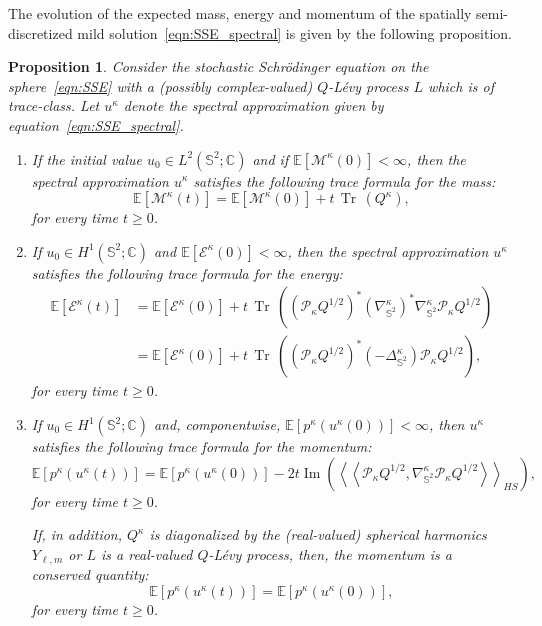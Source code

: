 \documentclass[11pt]{amsart}
\newtheorem{proposition}[theorem]{Proposition}
\newcommand{\IC}{\mathbb{C}}
\newcommand{\E}{{\mathbb E}}
\newcommand{\IS}{\mathbb{S}}
\newcommand{\tr}{{\operatorname{Tr}\, }}
\newcommand{\cE}{\mathcal E}
\newcommand{\cM}{\mathcal M}
\newcommand{\Deltalb}{\Delta_{\IS^2}}
\newcommand{\nablalb}{\nabla_{\IS^{2}}}
\newcommand{\cP}{\mathcal{P}}
\begin{document}
The evolution of the expected mass, energy and momentum of the spatially semi-discretized mild solution~\eqref{eqn:SSE_spectral} is given by the following proposition.
\begin{proposition}\label{prop:semi}
    Consider the stochastic Schrödinger equation on the sphere~\eqref{eqn:SSE} with a (possibly complex-valued) $Q$-Lévy process $L$ which is of trace-class.
    Let $u^\kappa$ denote the spectral approximation given by equation~\eqref{eqn:SSE_spectral}.
    \begin{enumerate}[label=\roman*)]
    \item If the initial value $u_0 \in {L^2(\IS^2; \IC)}$ and if $\E\left[\cM^\kappa(0)\right] < \infty$, then
    the spectral approximation $u^\kappa$ satisfies the following trace formula for the mass:
    \begin{equation*}
        \E\left[\cM^\kappa(t)\right] = \E\left[\cM^\kappa(0)\right] + t\,\tr(Q^\kappa),
    \end{equation*}
    for every time $t \geq 0$.
    \item If $u_0 \in {H^1(\IS^2; \IC)}$ and $\E\left[\cE^\kappa(0)\right] < \infty$, then
    the spectral approximation $u^\kappa$ satisfies the following trace formula for the energy:
	\begin{align*}
		\E\left[\cE^\kappa(t)\right] &= \E\left[\cE^\kappa(0)\right] + t\,\tr((\cP_\kappa Q^{1/2})^\ast(\nablalb^\kappa)^\ast\nablalb^\kappa\cP_\kappa Q^{1/2}) \\
		&=  \E\left[\cE^\kappa(0)\right] + t\,\tr((\cP_\kappa Q^{1/2})^\ast (-\Deltalb^\kappa) \cP_\kappa Q^{1/2}),
	\end{align*}
    for every time $t \geq 0$.
    \item If $u_0 \in {H^1(\IS^2; \IC)}$ and, componentwise, $\mathbb E\left[p^\kappa(u^\kappa(0))\right]<\infty$, then $u^\kappa$ satisfies the following trace formula for the momentum:
	\begin{equation*}
		\E\left[p^\kappa(u^\kappa(t))\right] = \E\left[p^\kappa(u^\kappa(0))\right]-2t\operatorname{Im}\left(\left<\left<\cP_\kappa Q^{1/2},\nablalb^\kappa \cP_\kappa Q^{1/2}\right>\right>_{HS}\right),
	\end{equation*}
    for every time $t \geq 0$.

	If, in addition, $Q^\kappa$ is diagonalized by the (real-valued) spherical harmonics $Y_{\ell,m}$ or $L$ is a real-valued $Q$-L\'evy process, then, the momentum is a conserved quantity:
	$$
	\E\left[p^\kappa(u^\kappa(t))\right] = \E\left[p^\kappa(u^\kappa(0))\right],
	$$
    for every time $t \geq 0$.
    \end{enumerate}
\end{proposition}
\end{document}
